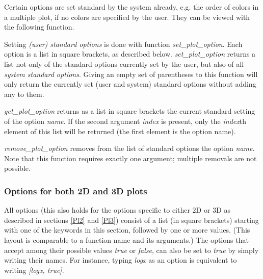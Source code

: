 \documentclass[../Maxima_Workbook.tex]{subfiles}
\begin{document}
\lz Certain options are set standard by the system already, e.g. the order of colors in a multiple plot, if no colors are specified by the user. They can be viewed with the following function.

\lzz {} \hfill \tcr{[function]}

 \hfill \tcr{[function]}

 \hfill \tcr{[function]}

\lz Setting \emph{(user) standard options} is done with function \emph{set\_plot\_option}. Each option is a list in square brackets, as described below. \emph{set\_plot\_option} returns a list not only of the standard options currently set by the user, but also of all \emph{system standard options}. Giving an empty set of parentheses to this function will only return the currently set (user and system) standard options without adding any to them.

\lz \emph{get\_plot\_option} returns as a list in square brackets the current standard setting of the option \emph{name}. If the second argument \emph{index} is present, only the \emph{index}th element of this list will be returned (the first element is the option name).

\lz \emph{remove\_plot\_option} removes from the list of standard options the option \emph{name}. Note that this function requires exactly one argument; multiple removals are not possible.

\subsubsection{Options for both 2D and 3D plots}\label{Pl1}

All options (this also holds for the options specific to either 2D or 3D as described in sections \ref{Pl2} and \ref{Pl3}) consist of a list (in square brackets) starting with one of the keywords in this section, followed by one or more values. (This layout is comparable to a function name and its arguments.) The options that accept among their possible values \emph{true} or \emph{false}, can also be set to \emph{true} by simply writing their names. For instance, typing \emph{logx} as an option is equivalent to writing \emph{[logx, true]}.
\end{document}
